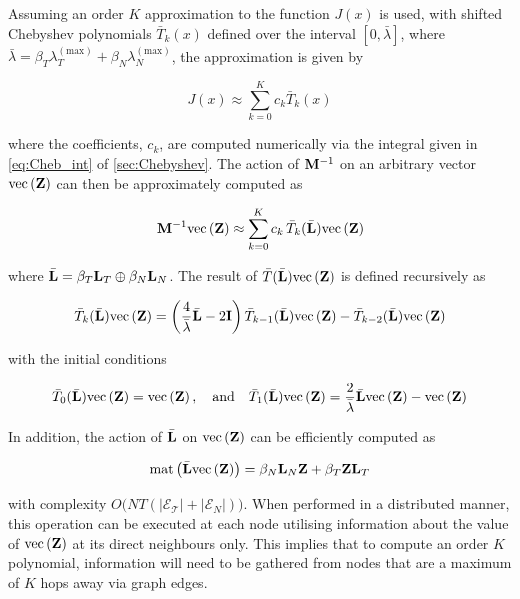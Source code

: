 Assuming an order $K$ approximation to the function $J(x)$ is used, with shifted Chebyshev polynomials ${\bar{T}_k(x)}$ defined over the interval $[0, \bar{\lambda}]$, where $\bar{\lambda} = \beta_T \lambda_T^{(\text{max})} + \beta_N \lambda_N^{(\text{max})}$,  the approximation is given by

\begin{equation}
    J(x) \approx \sum_{k=0}^K c_k \bar{T}_k(x)
\end{equation}

where the coefficients, $c_k$, are computed numerically via the integral given in \cref{eq:Cheb_int} of \cref{sec:Chebyshev}. The action of $\mathbf{M}^{-1}$ on an arbitrary vector $\text{\textup{vec}}\left(\mathbf{Z}\right)$ can then be approximately computed as

\begin{equation}
    \mathbf{M}^{-1} \text{\textup{vec}}\left(\mathbf{Z}\right) \approx \sum_{k=0}^K c_k \, \bar{T}_k(\bar{\mathbf{L}}) \text{\textup{vec}}\left(\mathbf{Z}\right) 
\end{equation}

where $\bar{\mathbf{L}} = \beta_T \mathbf{L}_T \oplus \beta_N \mathbf{L}_N$. The result of $\bar{T}(\bar{\mathbf{L}}) \text{\textup{vec}}\left(\mathbf{Z}\right) $ is defined recursively as 

\begin{equation}
    \bar{T}_k(\bar{\mathbf{L}}) \text{\textup{vec}}\left(\mathbf{Z}\right) = \left(\frac{4}{\bar{\lambda}}\bar{\mathbf{L}} - 2 \mathbf{I} \right) \bar{T}_{k-1}(\bar{\mathbf{L}}) \text{\textup{vec}}\left(\mathbf{Z}\right) -\bar{T}_{k-2}(\bar{\mathbf{L}}) \text{\textup{vec}}\left(\mathbf{Z}\right)
\end{equation}

with the initial conditions

\begin{equation}
    \bar{T}_0(\bar{\mathbf{L}}) \text{\textup{vec}}\left(\mathbf{Z}\right) = \text{\textup{vec}}\left(\mathbf{Z}\right), \quad \text{and} \quad \bar{T}_1(\bar{\mathbf{L}}) \text{\textup{vec}}\left(\mathbf{Z}\right) = \frac{2}{\bar{\lambda}} \bar{\mathbf{L}} \text{\textup{vec}}\left(\mathbf{Z}\right) - \text{\textup{vec}}\left(\mathbf{Z}\right)
\end{equation}

In addition, the action of $\bar{\mathbf{L}}$ on $\text{\textup{vec}}\left(\mathbf{Z}\right)$ can be efficiently computed as

\begin{equation}
    \text{\textup{mat}}\left(\bar{\mathbf{L}} \text{\textup{vec}}\left(\mathbf{Z}\right)\right) = \beta_N \mathbf{L}_N \mathbf{Z} + \beta_T \mathbf{Z} \mathbf{L}_T 
\end{equation}

with complexity $O\big(NT(|\mathcal{E_T}| + |\mathcal{E}_N|)\big)$. When performed in a distributed manner, this operation can be executed at each node utilising information about the value of $\text{\textup{vec}}\left(\mathbf{Z}\right)$ at its direct neighbours only. This implies that to compute an order $K$ polynomial, information will need to be gathered from nodes that are a maximum of $K$ hops away via graph edges. 

